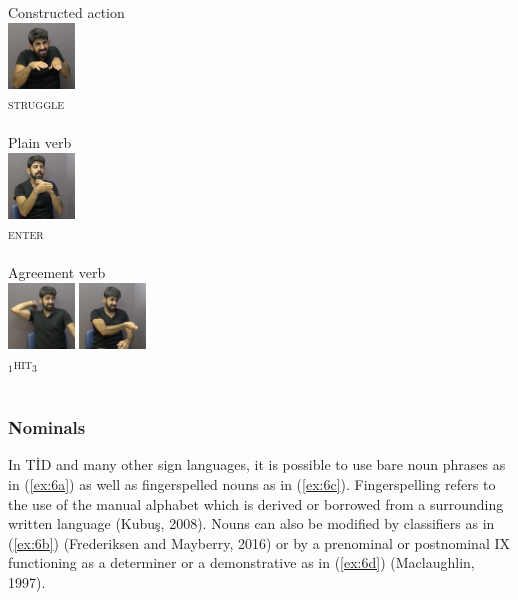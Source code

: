 \documentclass[]{elsarticle} %
\begin{document}
\begin{multicols}{3}
\begin{exe}
\ex
\begin{xlist}
\ex \label{ex:9a} Constructed action \\\glll 
\includegraphics[width=50pt]{pictures/4c.png} \\ \textsc{struggle} \\ \\

\ex \label{ex:9b} Plain verb  \\\glll
\includegraphics[width=50pt]{pictures/4a_2.png}  \\ \textsc{enter}\\ \\

\ex \label{ex:9c} Agreement verb  \\\glll 
\includegraphics[width=50pt]{pictures/4b_1.png} 
\includegraphics[width=50pt]{pictures/4b_2.png} \\ {\textsc{$_{1}$hit$_{3}$}} {} \\ \\ 
\end{xlist}
\end{exe}
\end{multicols}

\hypertarget{nominals}{%
\subsubsection{Nominals}\label{nominals}}

In TİD and many other sign languages, it is possible to use bare noun
phrases as in (\ref{ex:6a}) as well as fingerspelled nouns as in
(\ref{ex:6c}). Fingerspelling refers to the use of the manual alphabet
which is derived or borrowed from a surrounding written language (Kubuş,
2008). Nouns can also be modified by classifiers as in (\ref{ex:6b})
(Frederiksen and Mayberry, 2016) or by a prenominal or postnominal IX
functioning as a determiner or a demonstrative as in (\ref{ex:6d})
(Maclaughlin, 1997).
\end{document}
